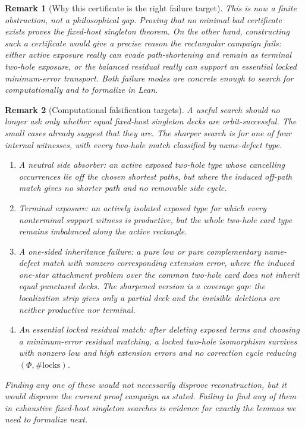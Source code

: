 \documentclass[11pt]{article}
\newtheorem{remark}{Remark}
\begin{document}
\begin{remark}[Why this certificate is the right failure target]
This is now a finite obstruction, not a philosophical gap.  Proving that no
minimal bad certificate exists proves the fixed-host singleton theorem.  On
the other hand, constructing such a certificate would give a precise reason
the rectangular campaign fails: either active exposure really can evade
path-shortening and remain as terminal two-hole exposure, or the balanced
residual really can support an essential locked minimum-error transport.  Both
failure modes are concrete enough to search for computationally and to
formalize in Lean.
\end{remark}

\begin{remark}[Computational falsification targets]
A useful search should no longer ask only whether equal fixed-host singleton
decks are orbit-successful.  The small cases already suggest that they are.
The sharper search is for one of four internal witnesses, with every
two-hole match classified by name-defect type.

\begin{enumerate}[leftmargin=2em]
  \item A neutral side absorber: an active exposed two-hole type whose
  cancelling occurrences lie off the chosen shortest paths, but where the
  induced off-path match gives no shorter path and no removable side cycle.

  \item Terminal exposure: an actively isolated exposed type for which every
  nonterminal support witness is productive, but the whole two-hole card type
  remains imbalanced along the active rectangle.

  \item A one-sided inheritance failure: a pure low or pure complementary
  name-defect match with nonzero corresponding extension error, where the
  induced one-star attachment problem over the common two-hole card does not
  inherit equal punctured decks.  The sharpened version is a coverage gap:
  the localization strip gives only a partial deck and the invisible deletions
  are neither productive nor terminal.

  \item An essential locked residual match: after deleting exposed terms and
  choosing a minimum-error residual matching, a locked two-hole isomorphism
  survives with nonzero low and high extension errors and no correction cycle
  reducing \((\Phi,\#\text{locks})\).
\end{enumerate}

Finding any one of these would not necessarily disprove reconstruction, but it
would disprove the current proof campaign as stated.  Failing to find any of
them in exhaustive fixed-host singleton searches is evidence for exactly the
lemmas we need to formalize next.
\end{remark}
\end{document}
